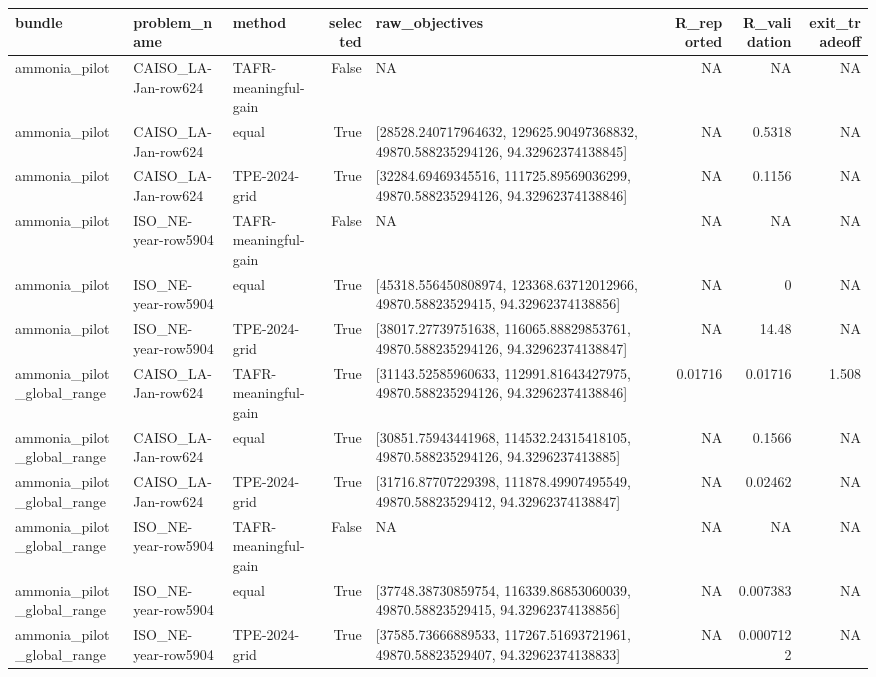 \begin{tabular}{lllrlrrr}
\toprule
bundle & problem\_name & method & selected & raw\_objectives & R\_reported & R\_validation & exit\_tradeoff \\
\midrule
ammonia\_pilot & CAISO\_LA-Jan-row624 & TAFR-meaningful-gain & False & NA & NA & NA & NA \\
ammonia\_pilot & CAISO\_LA-Jan-row624 & equal & True & [28528.240717964632, 129625.90497368832, 49870.588235294126, 94.32962374138845] & NA & 0.5318 & NA \\
ammonia\_pilot & CAISO\_LA-Jan-row624 & TPE-2024-grid & True & [32284.69469345516, 111725.89569036299, 49870.588235294126, 94.32962374138846] & NA & 0.1156 & NA \\
ammonia\_pilot & ISO\_NE-year-row5904 & TAFR-meaningful-gain & False & NA & NA & NA & NA \\
ammonia\_pilot & ISO\_NE-year-row5904 & equal & True & [45318.556450808974, 123368.63712012966, 49870.58823529415, 94.32962374138856] & NA & 0 & NA \\
ammonia\_pilot & ISO\_NE-year-row5904 & TPE-2024-grid & True & [38017.27739751638, 116065.88829853761, 49870.588235294126, 94.32962374138847] & NA & 14.48 & NA \\
ammonia\_pilot\_global\_range & CAISO\_LA-Jan-row624 & TAFR-meaningful-gain & True & [31143.52585960633, 112991.81643427975, 49870.588235294126, 94.32962374138846] & 0.01716 & 0.01716 & 1.508 \\
ammonia\_pilot\_global\_range & CAISO\_LA-Jan-row624 & equal & True & [30851.75943441968, 114532.24315418105, 49870.588235294126, 94.3296237413885] & NA & 0.1566 & NA \\
ammonia\_pilot\_global\_range & CAISO\_LA-Jan-row624 & TPE-2024-grid & True & [31716.87707229398, 111878.49907495549, 49870.58823529412, 94.32962374138847] & NA & 0.02462 & NA \\
ammonia\_pilot\_global\_range & ISO\_NE-year-row5904 & TAFR-meaningful-gain & False & NA & NA & NA & NA \\
ammonia\_pilot\_global\_range & ISO\_NE-year-row5904 & equal & True & [37748.38730859754, 116339.86853060039, 49870.58823529415, 94.32962374138856] & NA & 0.007383 & NA \\
ammonia\_pilot\_global\_range & ISO\_NE-year-row5904 & TPE-2024-grid & True & [37585.73666889533, 117267.51693721961, 49870.58823529407, 94.32962374138833] & NA & 0.0007122 & NA \\
\bottomrule
\end{tabular}
